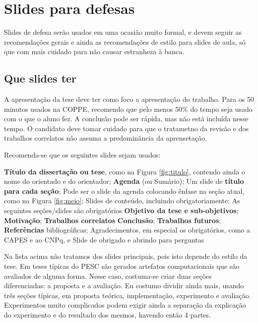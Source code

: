 \section{Slides para defesas}

Slides de defesa serão usados em uma ocasião muito formal, e devem seguir as recomendações gerais e ainda as recomendações de estilo para slides de aula, só que com mais cuidado para não causar estranheza à banca.

\subsection{Que slides ter}

A apresentação da tese deve ter como foco a apresentação do trabalho. Para os 50 minutos usados na COPPE, recomendo que pelo menos 50\% do tempo seja usado com o que o aluno fez. A conclusão pode ser rápida, mas não está incluída nesse tempo. O candidato deve tomar cuidado para que o tratametno da revisão e dos trabalhos correlatos não assuma a predominância da aprensetação.

Recomenda-se que os seguintes slides sejam usados:
\begin{outline}
    \1 \textbf{Título da dissertação ou tese}, como na Figura \ref{fig:titulo}, contendo ainda o nome do orientado e do orientador;
    \1 \textbf{Agenda} (ou Sumário);
    \1 Um slide de \textbf{título para cada seção};
    \2 Pode ser o slide da agenda colocando ênfase na seção atual, como na Figura \ref{fig:meio};
    \2 Slides de conteúdo, incluindo obrigatoriamente;
    \2 As seguintes seções/slides são obrigatórios
        \3 \textbf{Objetivo da tese e sub-objetivos};
        \3 \textbf{Motivação};
        \3 \textbf{Trabalhos correlatos}
        \3 \textbf{Conclusão};
        \3 \textbf{Trabalhos futuros};
    \1 \textbf{Referências} bibliográficas;
    \1 Agradecimentos, em especial os obrigatórios, como a CAPES e ao CNPq, e
    \1 Slide de obrigado e abrindo para perguntas
\end{outline}

Na lista acima não tratamos dos slides principais, pois isto depende do estilo da tese. Em teses típicas do PESC são gerados artefatos computacionais que são avaliados de alguma forma. Nesse caso, costuma-se criar duas seções diferenciadas: a proposta e a avaliação. Eu costumo dividir ainda mais, usando três seções típicas, em proposta teórica, implementação, experimento e avaliação. Experimentos muito complicados podem exigir ainda a separação da explicação do experimento e do resultado dos mesmos, havendo então 4 partes.

